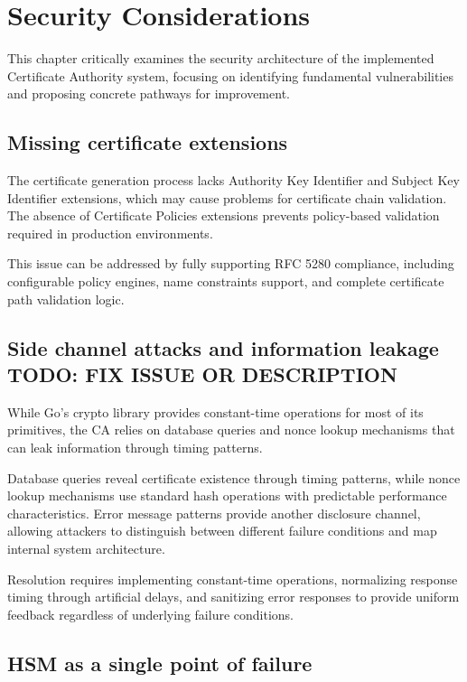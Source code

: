 \chapter{Security Considerations}

This chapter critically examines the security architecture of the implemented Certificate 
Authority system, focusing on identifying fundamental vulnerabilities and proposing 
concrete pathways for improvement.


\section{Missing certificate extensions}

The certificate generation process lacks Authority Key Identifier and Subject Key Identifier extensions,
which may cause problems for certificate chain validation. The absence of Certificate Policies extensions 
prevents policy-based validation required in production environments.

This issue can be addressed by fully supporting RFC 5280 \cite{rfc5280} compliance, 
including configurable policy engines, name constraints support, and complete certificate path 
validation logic.


\section{Side channel attacks and information leakage {\color{red}TODO: FIX ISSUE OR DESCRIPTION}}

While Go's crypto library provides constant-time operations for most of its primitives, the CA
relies on database queries and nonce lookup mechanisms that can leak information through timing
patterns. 

Database queries reveal certificate existence through timing patterns, while nonce lookup mechanisms 
use standard hash operations with predictable performance characteristics. Error message patterns
provide another disclosure channel, allowing attackers to distinguish between different failure 
conditions and map internal system architecture.

Resolution requires implementing constant-time operations, normalizing response timing through 
artificial delays, and sanitizing error responses to provide uniform feedback regardless of underlying 
failure conditions.


\section{HSM as a single point of failure}


